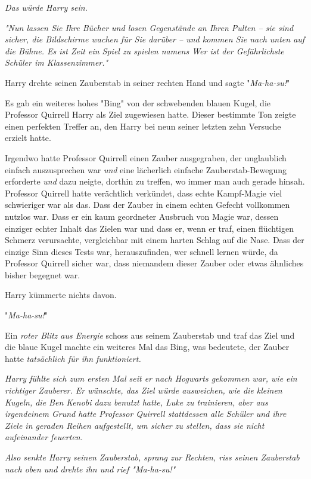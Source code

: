 {\emph{Das würde Harry sein.}

\emph{"Nun lassen Sie Ihre Bücher und losen Gegenstände an Ihren Pulten -- sie sind sicher, die Bildschirme wachen für Sie darüber -- und kommen Sie nach unten auf die Bühne. Es ist Zeit ein Spiel zu spielen namens Wer ist der Gefährlichste Schüler im Klassenzimmer."}

Harry drehte seinen Zauberstab in seiner rechten Hand und sagte "\emph{Ma-ha-su!}"

Es gab ein weiteres hohes "Bing" von der schwebenden blauen Kugel, die Professor Quirrell Harry als Ziel zugewiesen hatte. Dieser bestimmte Ton zeigte einen perfekten Treffer an, den Harry bei neun seiner letzten zehn Versuche erzielt hatte.

Irgendwo hatte Professor Quirrell einen Zauber ausgegraben, der unglaublich einfach auszusprechen war \emph{und} eine lächerlich einfache Zauberstab-Bewegung erforderte \emph{und} dazu neigte, dorthin zu treffen, wo immer man auch gerade hinsah. Professor Quirrell hatte verächtlich verkündet, dass echte Kampf-Magie viel schwieriger war als das. Dass der Zauber in einem echten Gefecht vollkommen nutzlos war. Dass er ein kaum geordneter Ausbruch von Magie war, dessen einziger echter Inhalt das Zielen war und dass er, wenn er traf, einen flüchtigen Schmerz verursachte, vergleichbar mit einem harten Schlag auf die Nase. Dass der einzige Sinn dieses Tests war, herauszufinden, wer schnell lernen würde, da Professor Quirrell sicher war, dass niemandem dieser Zauber oder etwas ähnliches bisher begegnet war.

Harry kümmerte nichts davon.

"\emph{Ma-ha-su!}"

Ein \emph{roter Blitz aus Energie} schoss aus seinem Zauberstab und traf das Ziel und die blaue Kugel machte ein weiteres Mal das Bing, was bedeutete, der Zauber hatte \emph{tatsächlich für ihn funktioniert.}

\emph{Harry fühlte sich zum ersten Mal seit er nach Hogwarts gekommen war, wie ein richtiger Zauberer. Er wünschte, das Ziel würde ausweichen, wie die kleinen Kugeln, die Ben Kenobi dazu benutzt hatte, Luke zu trainieren, aber aus irgendeinem Grund hatte Professor Quirrell stattdessen alle Schüler und ihre Ziele in geraden Reihen aufgestellt, um sicher zu stellen, dass sie nicht aufeinander feuerten.}

\emph{Also senkte Harry seinen Zauberstab, sprang zur Rechten, riss seinen Zauberstab nach oben und drehte ihn und rief "\emph{Ma-ha-su!}"}

}
